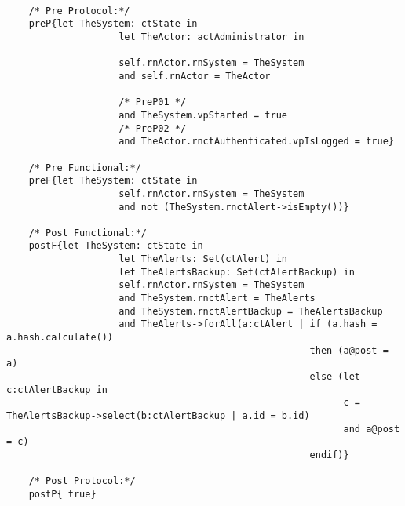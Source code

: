 	\scriptsize
	\vspace{0.5cm}
	\begin{lstlisting}[style=MessirStyle,firstnumber=auto,captionpos=b,caption={\msrmessir (MCL-oriented) specification of the operation \emph{oeCheckAlertsIntegrity}.},label=OM-actAdministrator-oeCheckAlertsIntegrity-MCL-LST]

	/* Pre Protocol:*/ 
	preP{let TheSystem: ctState in
	  				let TheActor: actAdministrator in
	  
					self.rnActor.rnSystem = TheSystem
					and self.rnActor = TheActor
	  
					/* PreP01 */
					and TheSystem.vpStarted = true
					/* PreP02 */
					and TheActor.rnctAuthenticated.vpIsLogged = true}
	
	/* Pre Functional:*/
	preF{let TheSystem: ctState in
					self.rnActor.rnSystem = TheSystem
					and not (TheSystem.rnctAlert->isEmpty())}
	
	/* Post Functional:*/ 
	postF{let TheSystem: ctState in
					let TheAlerts: Set(ctAlert) in
					let TheAlertsBackup: Set(ctAlertBackup) in
					self.rnActor.rnSystem = TheSystem
					and TheSystem.rnctAlert = TheAlerts
					and TheSystem.rnctAlertBackup = TheAlertsBackup
					and TheAlerts->forAll(a:ctAlert | if (a.hash = a.hash.calculate()) 
													  then (a@post = a) 
													  else (let c:ctAlertBackup in
															c = TheAlertsBackup->select(b:ctAlertBackup | a.id = b.id)
															and a@post = c) 
													  endif)}
	
	/* Post Protocol:*/ 
	postP{ true}
	
	\end{lstlisting}
	\normalsize 
	
	
	
	





